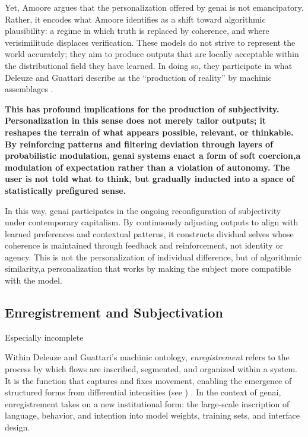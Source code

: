 Yet, Amoore \parencite{amoore2024} argues that the personalization offered by \gls{genai} is not emancipatory. Rather, it encodes what Amoore \parencite{amoore2024} identifies as a shift toward algorithmic plausibility: a regime in which truth is replaced by coherence, and where verisimilitude displaces verification. These models do not strive to represent the world accurately; they aim to produce outputs that are locally acceptable within the distributional field they have learned. In doing so, they participate in what Deleuze and Guattari describe as the “production of reality” by machinic assemblages \parencite{deleuze1983}.

\textbf{This has profound implications for the production of subjectivity. Personalization in this sense does not merely tailor outputs; it reshapes the terrain of what appears possible, relevant, or thinkable. By reinforcing patterns and filtering deviation through layers of probabilistic modulation, \gls{genai} systems enact a form of soft coercion,a modulation of expectation rather than a violation of autonomy. The user is not told what to think, but gradually inducted into a space of statistically prefigured sense.}

In this way, \gls{genai} participates in the ongoing reconfiguration of subjectivity under contemporary capitalism. By continuously adjusting outputs to align with learned preferences and contextual patterns, it constructs dividual selves whose coherence is maintained through feedback and reinforcement, not identity or agency. This is not the personalization of individual difference, but of algorithmic similarity,a personalization that works by making the subject more compatible with the model.

\subsection{Enregistrement and Subjectivation}


\begin{orangebox}
	Especially incomplete
\end{orangebox}

Within Deleuze and Guattari's machinic ontology, \emph{enregistrement} refers to the process by which flows are inscribed, segmented, and organized within a system. It is the function that captures and fixes movement, enabling the emergence of structured forms from differential intensities (see \cite[4]{deleuze1983}) . In the context of \gls{genai}, enregistrement takes on a new institutional form: the large-scale inscription of language, behavior, and intention into model weights, training sets, and interface design.

